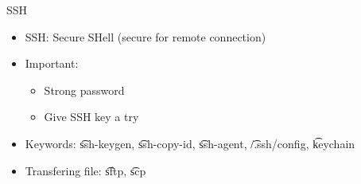 \begin{frame}{SSH}
\begin{itemize}
\item SSH: Secure SHell (secure for remote connection)
\item Important:
\begin{itemize}
\item Strong password
\item Give SSH key a try
\end{itemize}
\item Keywords: \t{ssh-keygen}, \t{ssh-copy-id}, \t{ssh-agent}, \t{\sm/.ssh/config}, \t{keychain}
\item Transfering file: \t{sftp}, \t{scp}
\end{itemize}
\end{frame}

